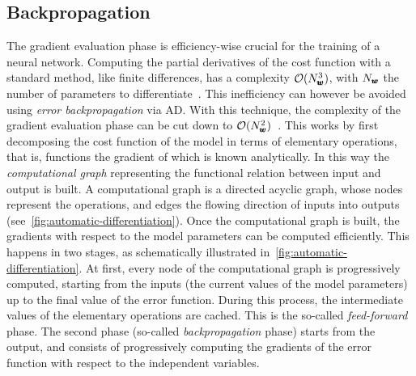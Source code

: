 \subsection{Backpropagation}
\label{subsec:backpropagation}
The gradient evaluation phase is efficiency-wise crucial for the training of a neural network.
Computing the partial derivatives of the cost function with a standard method, like finite differences, has a complexity $\mathcal O(N_{\pmb{w}}^3)$, with $N_{\pmb{w}}$ the number of parameters to differentiate~\cite{bishop2006pattern}.
This inefficiency can however be avoided using \emph{error backpropagation} via \ac{AD}.
With this technique, the complexity of the gradient evaluation phase can be cut down to $\mathcal O(N_{\pmb{w}}^2)$~\cite{bishop2006pattern}.
This works by first decomposing the cost function of the model in terms of elementary operations, that is, functions the gradient of which is known analytically.
In this way the \emph{computational graph} representing the functional relation between input and output is built.
A computational graph is a directed acyclic graph, whose nodes represent the operations, and edges the flowing direction of inputs into outputs (see~\cref{fig:automatic-differentiation}).
Once the computational graph is built, the gradients with respect to the model parameters can be computed efficiently.
This happens in two stages, as schematically illustrated in~\cref{fig:automatic-differentiation}.
At first, every node of the computational graph is progressively computed, starting from the inputs (the current values of the model parameters) up to the final value of the error function.
During this process, the intermediate values of the elementary operations are cached.
This is the so-called \emph{feed-forward} phase.
The second phase (so-called \emph{backpropagation} phase) starts from the output, and consists of progressively computing the gradients of the error function with respect to the independent variables.

